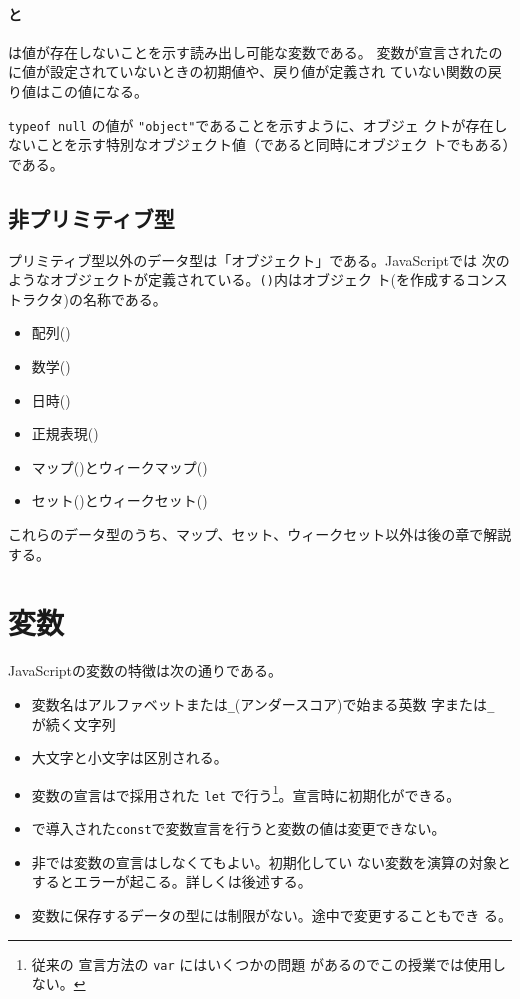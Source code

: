 \paragraph{\protect{}と\protect{}}
は値が存在しないことを示す読み出し可能な変数である。
変数が宣言されたのに値が設定されていないときの初期値や、戻り値が定義され
ていない関数の戻り値はこの値になる。

\Verb+typeof null+ の値が \Verb+"object"+であることを示すように、オブジェ
クトが存在しないことを示す特別なオブジェクト値（であると同時にオブジェク
トでもある）である。\\[-1.5\baselineskip]
\subsection{非プリミティブ型}
プリミティブ型以外のデータ型は「オブジェクト」である。JavaScriptでは
次のようなオブジェクトが定義されている。\texttt{()}内はオブジェク
ト(を作成するコンストラクタ)の名称である。
\begin{itemize}
 \item 配列()
 \item 数学()
 \item 日時()
 \item 正規表現()
 \item マップ()とウィークマップ()
 \item セット()とウィークセット()
\end{itemize}
これらのデータ型のうち、マップ、セット、ウィークセット以外は後の章で解説する。 
\section{変数}
JavaScriptの変数の特徴は次の通りである。
\begin{itemize}
 \item 変数名はアルファベットまたは\Verb+_+(アンダースコア)で始まる英数
       字または\Verb+_+ が続く文字列
 \item 大文字と小文字は区別される。
 \item 変数の宣言は\ES で採用された \texttt{let} で行う\footnote{従来の
       宣言方法の \texttt{var} にはいくつかの問題
       があるのでこの授業では使用しない。}。宣言時に初期化ができる。
 \item \ES で導入された\texttt{const}で変数宣言を行うと変数の値は変更できない。
 \item 非\Strict では変数の宣言はしなくてもよい。初期化してい
       ない変数を演算の対象とするとエラーが起こる。詳しくは後述する。
 \item 変数に保存するデータの型には制限がない。途中で変更することもでき
       る。
\end{itemize}
